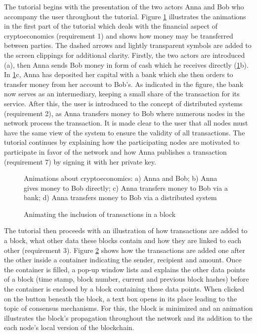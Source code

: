 The tutorial begins with the presentation of the two actors Anna and Bob who accompany the user throughout the tutorial. Figure \ref{fig:Animationline} illustrates the animations in the first part of the tutorial which deals with the financial aspect of cryptoeconomics (requirement 1) and shows how money may be transferred between parties. The dashed arrows and lightly transparent symbols are added to the screen clippings for additional clarity. Firstly, the two actors are introduced (a), then Anna sends Bob money in form of cash which he receives directly (\ref{fig:Animationline}b). In \ref{fig:Animationline}c, Anna has deposited her capital with a bank which she then orders to transfer money from her account to Bob's. As indicated in the figure, the bank now serves as an intermediary, keeping a small share of the transaction for its service. After this, the user is introduced to the concept of distributed systems (requirement 2), as Anna transfers money to Bob where numerous nodes in the network process the transaction. It is made clear to the user that all nodes must have the same view of the system to ensure the validity of all transactions. The tutorial continues by explaining how the participating nodes are motivated to participate in favor of the network and how Anna publishes a transaction (requirement 7) by signing it with her private key.

\begin{figure}
    \centering
       
    \caption{Animations about cryptoeconomics: a) Anna and Bob; b) Anna gives money to Bob directly; c) Anna transfers money to Bob via a bank; d) Anna transfers money to Bob via a distributed system}
    \label{fig:Animationline}
\end{figure}


\begin{figure}
    \centering
       
    \caption{Animating the inclusion of transactions in a block}
    \label{fig:AnimationBlock}
\end{figure}

The tutorial then proceeds with an illustration of how transactions are added to a block, what other data these blocks contain and how they are linked to each other (requirement 3). Figure \ref{fig:AnimationBlock} shows how the transactions are added one after the other inside a container indicating the sender, recipient and amount. Once the container is filled, a pop-up window lists and explains the other data points of a block (time stamp, block number, current and previous block hashes) before the container is enclosed by a block containing these data points. When clicked on the button beneath the block, a text box opens in its place leading to the topic of consensus mechanisms. For this, the block is minimized and an animation illustrates the block's propagation throughout the network and its addition to the each node's local version of the blockchain.

